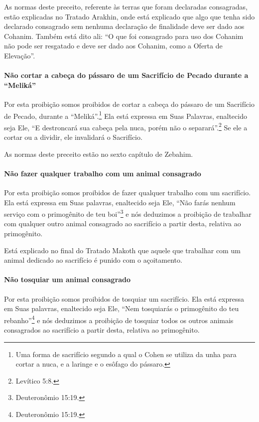 As normas deste preceito, referente às terras que foram declaradas
consagradas, estão explicadas no Tratado Arakhin, onde está explicado
que algo que tenha sido declarado consagrado sem nenhuma declaração de
finalidade deve ser dado aos Cohanim. Também está dito ali: ``O que
foi consagrado para uso dos Cohanim não pode ser resgatado e deve ser
dado aos Cohanim, como a Oferta de Elevação''.

\paragraph{Não cortar a cabeça do pássaro de um Sacrifício de Pecado durante a ``Meliká''}

Por esta proibição somos proibidos de cortar a cabeça do pássaro de um
Sacrifício de Pecado, durante a ``Meliká''.\footnote{Uma forma de sacrifício segundo a qual o Cohen se utiliza da
unha para cortar a nuca, e a laringe e o esôfago do pássaro.} Ela
está expressa em Suas Palavras, enaltecido seja Ele, ``E destroncará sua
cabeça pela nuca, porém não o separará''.\footnote{Levítico 5:8.} Se ele a cortar
ou a dividir, ele invalidará o Sacrifício.

As normas deste preceito estão no sexto capítulo de Zebahim.

\paragraph{Não fazer qualquer trabalho com um animal consagrado}

Por esta proibição somos proibidos de fazer qualquer trabalho com um
sacrifício. Ela está expressa em Suas palavras, enaltecido seja Ele,
``Não farás nenhum serviço com o primogênito de teu boi''\footnote{Deuteronômio
15:19.} e nós deduzimos a proibição de trabalhar com qualquer outro
animal consagrado ao sacrifício a partir desta, relativa ao
primogênito.

Está explicado no final do Tratado Makoth que aquele que trabalhar com
um animal dedicado ao sacrifício é punido com o açoitamento.

\paragraph{Não tosquiar um animal consagrado}

Por esta proibição somos proibidos de tosquiar um sacrifício. Ela está
expressa em Suas palavras, enaltecido seja Ele, ``Nem tosquiarás o
primogênito do teu rebanho''\footnote{Deuteronômio 15:19.} e nós deduzimos a
proibição de tosquiar todos os outros animais consagrados ao sacrifício
a partir desta, relativa ao primogênito.

